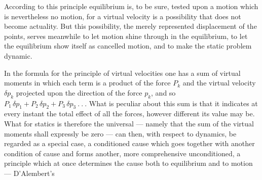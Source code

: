 \documentclass[12pt,a4paper]{book}
\begin{document}
According to this principle equilibrium is, to be sure, tested upon a motion which is
nevertheless no motion, for a virtual velocity is a possibility that does not become
actuality. But this possibility, the merely represented displacement of the points, serves
meanwhile to let motion shine through in the equilibrium, to let the equilibrium show itself
as cancelled motion, and to make the static problem dynamic.

In the formula for the principle of virtual velocities one has a sum of virtual moments in
which each term is a product of the force $P_{k}$ and the virtual velocity $\delta p_{k}$
projected upon the direction of the force $p_{k}$, and so $P_{1}\, \delta p_{1} + P_{2}\,
\delta p_{2} + P_{3}\, \delta p_{3} \ .\ .\ .$ What is peculiar about this sum is that it
indicates at every instant the total effect of all the forces, however different its value
may be. What for statics is therefore the universal --- namely that the sum of the virtual
moments shall expressly be zero --- can then, with respect to dynamics, be regarded as a
special case, a conditioned cause which goes together with another condition of cause and
forms another, more comprehensive unconditioned, a principle which at once determines the
cause both to equilibrium and to motion --- D'Alembert's
\end{document}
